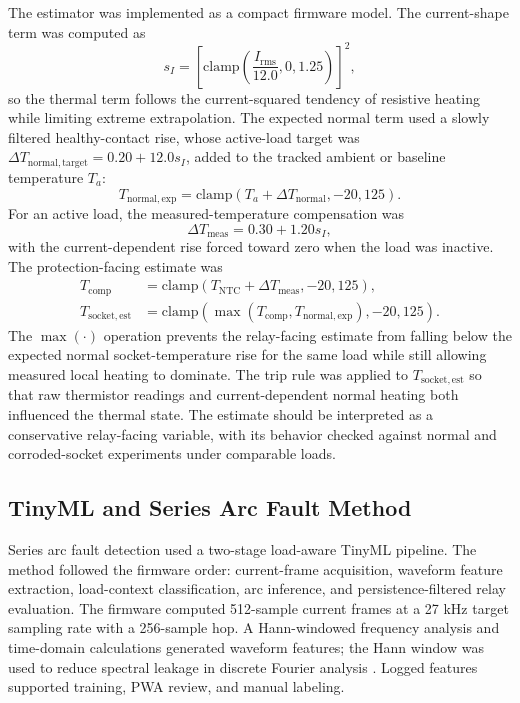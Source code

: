 \documentclass[conference,a4paper]{template/IEEEtran}
\begin{document}
The estimator was implemented as a compact firmware model. The
current-shape term was computed as
\begin{equation}
s_I=\left[\mathrm{clamp}\left(\frac{I_{\mathrm{rms}}}{12.0},0,1.25\right)\right]^2,
\end{equation}
so the thermal term follows the current-squared tendency of resistive
heating while limiting extreme extrapolation. The expected normal term
used a slowly filtered healthy-contact rise, whose active-load target was
$\Delta T_{\mathrm{normal,target}}=0.20+12.0s_I$, added to the tracked
ambient or baseline temperature $T_a$:
\begin{equation}
T_{\mathrm{normal,exp}}=
\mathrm{clamp}(T_a+\Delta T_{\mathrm{normal}},-20,125).
\end{equation}
For an active load, the measured-temperature compensation was
\begin{equation}
\Delta T_{\mathrm{meas}}=0.30+1.20s_I,
\end{equation}
with the current-dependent rise forced toward zero when the load was
inactive. The protection-facing estimate was
\begin{equation}
\begin{aligned}
T_{\mathrm{comp}} &=
\mathrm{clamp}(T_{\mathrm{NTC}}+\Delta T_{\mathrm{meas}},-20,125),\\
T_{\mathrm{socket,est}} &=
\mathrm{clamp}\left(\max(T_{\mathrm{comp}},T_{\mathrm{normal,exp}}),
-20,125\right).
\end{aligned}
\end{equation}
The $\max(\cdot)$ operation prevents the relay-facing estimate from
falling below the expected normal socket-temperature rise for the same load while
still allowing measured local heating to dominate. The trip rule was
applied to $T_{\mathrm{socket,est}}$ so that raw thermistor readings and
current-dependent normal heating both influenced the thermal state. The
estimate should be interpreted as a conservative relay-facing variable,
with its behavior checked against normal and corroded-socket experiments
under comparable loads.

\subsection{TinyML and Series Arc Fault Method}

Series arc fault detection used a two-stage load-aware TinyML pipeline. The
method followed the firmware order: current-frame acquisition, waveform
feature extraction, load-context classification, arc inference, and
persistence-filtered relay evaluation. The firmware computed 512-sample
current frames at a 27 kHz target sampling rate with a 256-sample hop. A
Hann-windowed frequency analysis and time-domain calculations generated
waveform features; the Hann window was used to reduce spectral leakage
in discrete Fourier analysis
\cite{harris-dft}. Logged features supported training, PWA review, and
manual labeling.
\end{document}
